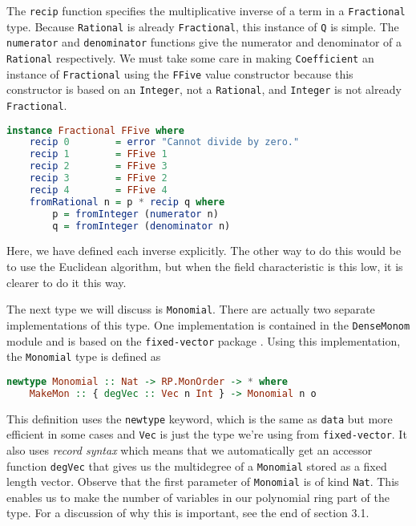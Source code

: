 \documentclass[MS, xcolor=dvipsnames]{wfuthesis}
\theoremstyle{definition}
\begin{document}
The \lstinline{recip} function specifies the multiplicative inverse of a term in a \lstinline{Fractional} type. Because \lstinline{Rational} is already \lstinline{Fractional}, this instance of \lstinline{Q} is simple. The \lstinline{numerator} and \lstinline{denominator} functions give the numerator and denominator of a \lstinline{Rational} respectively. We must take some care in making \lstinline{Coefficient} an instance of \lstinline{Fractional} using the \lstinline{FFive} value constructor because this constructor is based on an \lstinline{Integer}, not a \lstinline{Rational}, and \lstinline{Integer} is not already \lstinline{Fractional}.
\begin{lstlisting}[language=Haskell]
instance Fractional FFive where
    recip 0        = error "Cannot divide by zero."
    recip 1        = FFive 1
    recip 2        = FFive 3
    recip 3        = FFive 2
    recip 4        = FFive 4
    fromRational n = p * recip q where
        p = fromInteger (numerator n)
        q = fromInteger (denominator n)
\end{lstlisting}
Here, we have defined each inverse explicitly. The other way to do this would be to use the Euclidean algorithm, but when the field characteristic is this low, it is clearer to do it this way. \par
The next type we will discuss is \lstinline{Monomial}. There are actually two separate implementations of this type. One implementation is contained in the \lstinline{DenseMonom} module and is based on the \lstinline{fixed-vector} package \cite{Shimuuar}. Using this implementation, the \lstinline{Monomial} type is defined as
\begin{lstlisting}[language=Haskell]
newtype Monomial :: Nat -> RP.MonOrder -> * where
    MakeMon :: { degVec :: Vec n Int } -> Monomial n o
\end{lstlisting}
This definition uses the \lstinline{newtype} keyword, which is the same as \lstinline{data} but more efficient in some cases and \lstinline{Vec} is just the type we're using from \lstinline{fixed-vector}. It also uses \emph{record syntax} which means that we automatically get an accessor function \lstinline{degVec} that gives us the multidegree of a \lstinline{Monomial} stored as a fixed length vector. Observe that the first parameter of \lstinline{Monomial} is of kind \lstinline{Nat}. This enables us to make the number of variables in our polynomial ring part of the type. For a discussion of why this is important, see the end of section 3.1. \par
\end{document}
